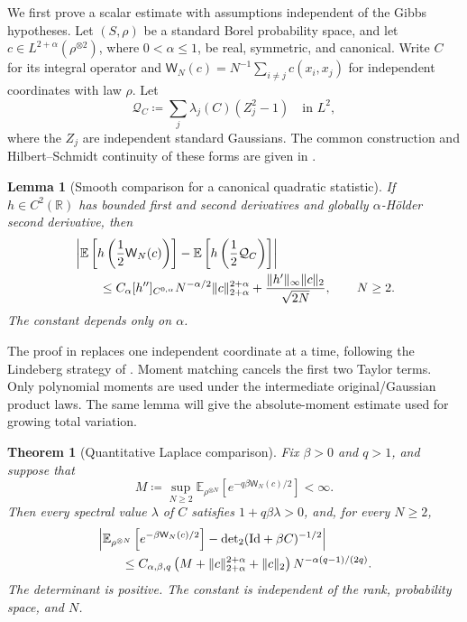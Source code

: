 \documentclass[11pt,reqno]{amsart}
\numberwithin{equation}{section}
\theoremstyle{plain}
\newtheorem{thm}{Theorem}[section]
\newtheorem{lemma}[lemma]{Lemma}
\theoremstyle{remark}
\DeclarePairedDelimiter{\norm}{\lVert}{\rVert}
\newcommand{\R}{{\mathbb{R}}}
\newcommand{\E}{{\mathbb{E}}}
\newcommand{\be}{\beta}
\newcommand{\detTwo}{\operatorname{det}_2}
\begin{document}
We first prove a scalar estimate with assumptions independent of the Gibbs
hypotheses.  Let $(S,\rho)$ be a standard Borel probability space, and let
$c\in L^{2+\alpha}(\rho^{\otimes2})$, where $0<\alpha\leq1$, be real,
symmetric, and canonical.  Write $C$ for its integral operator and
$\mathsf W_N(c)=N^{-1}\sum_{i\ne j}c(x_i,x_j)$ for independent coordinates
with law $\rho$.  Let
\begin{equation}\label{eq:signed-general-Gaussian-form}
 \mathcal Q_C\coloneqq\sum_j\lambda_j(C)(Z_j^2-1)
 \quad\text{in }L^2,
\end{equation}
where the $Z_j$ are independent standard Gaussians.  The common construction
and Hilbert--Schmidt continuity of these forms are given in
.

\begin{lemma}[Smooth comparison for a canonical quadratic statistic]
\label{lem:quadratic-smooth-comparison}
If $h\in C^2(\R)$ has bounded first and second derivatives and globally
$\alpha$-H\"older second derivative, then
\begin{align}
 &\left|\E\left[h\left(\frac12\mathsf W_N(c)\right)\right]
          -\E\left[h\left(\frac12\mathcal Q_C\right)\right]\right|\notag\\
 &\qquad\leq C_\alpha[h'']_{C^{0,\alpha}}
         N^{-\alpha/2}\norm c_{2+\alpha}^{2+\alpha}
       +\frac{\norm{h'}_\infty\norm c_2}{\sqrt{2N}},\qquad N\geq2.
 \label{eq:quadratic-smooth-comparison}
\end{align}
The constant depends only on $\alpha$.
\end{lemma}

The proof in  replaces one independent
coordinate at a time, following the Lindeberg strategy of
\cite[Section~2]{Chatterjee2006}.  Moment matching cancels the first two
Taylor terms.  Only polynomial moments are used under the intermediate
original/Gaussian product laws.  The same lemma will give the absolute-moment
estimate used for growing total variation.

\begin{thm}[Quantitative Laplace comparison]
\label{thm:quantitative-signed-Laplace}
Fix $\be>0$ and $q>1$, and suppose that
\begin{equation}\label{eq:signed-scalar-exponential-assumption}
 M\coloneqq\sup_{N\geq2}\E_{\rho^{\otimes N}}
                \left[e^{-q\be\mathsf W_N(c)/2}\right]<\infty.
\end{equation}
Then every spectral value $\lambda$ of $C$ satisfies $1+q\be\lambda>0$,
and, for every $N\geq2$,
\begin{align}
 &\left|\E_{\rho^{\otimes N}}\left[e^{-\be\mathsf W_N(c)/2}\right]
        -\detTwo(\mathrm{Id}+\be C)^{-1/2}\right|\notag\\
 &\qquad\leq C_{\alpha,\be,q}
       \left(M+\norm c_{2+\alpha}^{2+\alpha}+\norm c_2\right)
       N^{-\alpha(q-1)/(2q)}.
 \label{eq:signed-scalar-Laplace-bound}
\end{align}
The determinant is positive.  The constant is independent of the rank,
probability space, and $N$.
\end{thm}
\end{document}
